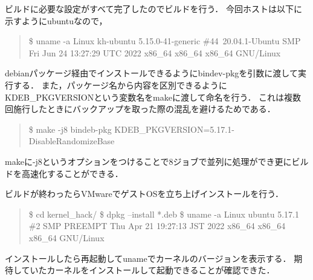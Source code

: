 ビルドに必要な設定がすべて完了したのでビルドを行う．
今回ホストは以下に示すようにubuntuなので，
\begin{quote}
\$ uname -a
Linux kh-ubuntu 5.15.0-41-generic \#44~20.04.1-Ubuntu SMP Fri Jun 24 13:27:29 UTC 2022 x86\_64 x86\_64 x86\_64 GNU/Linux
\end{quote}

debianパッケージ経由でインストールできるようにbindev-pkgを引数に渡して実行する．
また，パッケージ名から内容を区別できるようにKDEB\_PKGVERSIONという変数名をmakeに渡して命名を行う．
これは複数回施行したときにバックアップを取った際の混乱を避けるためである．
\begin{quote}
\$ make -j8 bindeb-pkg  KDEB\_PKGVERSION=5.17.1-DisableRandomizeBase
\end{quote}

makeに-j8というオプションをつけることで8ジョブで並列に処理ができ更にビルドを高速化することができる．

ビルドが終わったらVMwareでゲストOSを立ち上げインストールを行う．
\begin{quote}
\$ cd kernel\_hack/
\$ dpkg --install *.deb
\$ uname -a
Linux ubuntu 5.17.1 \#2 SMP PREEMPT Thu Apr 21 19:27:13 JST 2022 x86\_64 x86\_64 x86\_64 GNU/Linux
\end{quote}

インストールしたら再起動してunameでカーネルのバージョンを表示する．
期待していたカーネルをインストールして起動できることが確認できた．

